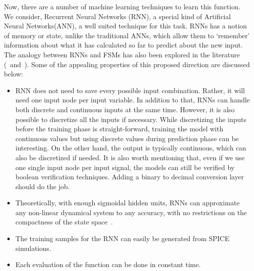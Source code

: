 \documentclass[a4paper]{article}
\begin{document}
Now, there are a number of machine learning techniques to learn this function. We consider, Recurrent Neural Networks (RNN), a special kind of Artificial Neural Networks(ANN), a well suited technique for this task. RNNs has a notion of memory or state,  unlike the traditional ANNs, which allow them to `remember' information about what it has calculated so far to predict about the new input. The analogy between RNNs and FSMs has also been explored in the literature (\cite{RNN_FSM1}~and~\cite{RNN_FSM2}). Some of the appealing properties of this proposed direction are discussed below:  
	





\begin{itemize}
	\item RNN does not need to save every possible input combination. Rather, it will need one input node per input variable. In addition to that, RNNs can handle both discrete and continuous inputs at the same time. However, it is also possible to discretize all the inputs if necessary. While discretizing the inputs before the training phase is straight-forward, training the model with continuous values but using discrete values during prediction phase can be interesting. On the other hand, the output is typically continuous, which can also be discretized if needed. 
	It is also worth mentioning that, even if we use one single input node per input signal, the models can still be verified by boolean verification techniques. Adding a binary to decimal conversion layer should do the job.
	 
	\item Theoretically, with enough sigmoidal hidden units, RNNs can approximate any non-linear dynamical system to any accuracy, with no restrictions on the compactness of the state space~\cite{RNN_UNI_APPX}.  
	\item The training samples for the RNN can easily be generated from SPICE simulations. 
	\item Each evaluation of the function can be done in constant time. %
\end{itemize}
\end{document}
